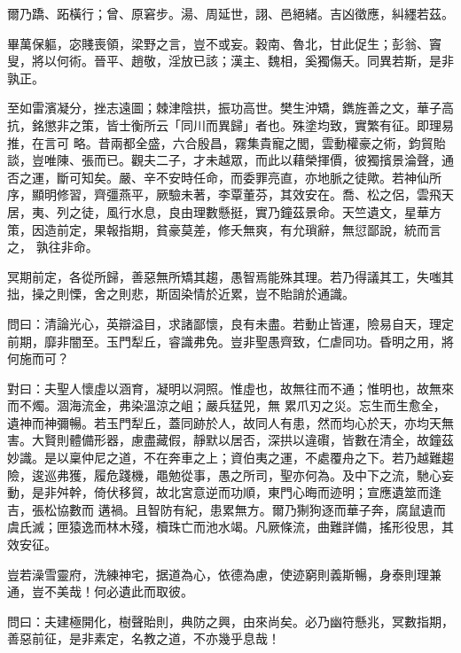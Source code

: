 \begin{pinyinscope}
 爾乃蹻、跖橫行；曾、原窘步。湯、周延世，詡、邑絕緒。吉凶徵應，糾纆若茲。



 畢萬保軀，宓賤喪領，梁野之言，豈不或妄。穀南、魯北，甘此促生；彭翁、竇叟，將以何術。晉平、趙敬，淫放已該；漢主、魏相，奚獨傷夭。同異若斯，是非孰正。



 至如雷濱凝分，挫志遠圖；棘津陰拱，振功高世。樊生沖矯，鐫旌善之文，華子高抗，銘懲非之策，皆士衡所云「同川而異歸」者也。殊塗均致，實繁有征。即理易推，在言可
 略。昔兩都全盛，六合殷昌，霧集貴寵之閭，雲動權豪之術，鈞貿貽談，豈唯陳、張而已。觀夫二子，才未越眾，而此以藉榮揮價，彼獨擯景淪聲，通否之運，斷可知矣。嚴、辛不安時任命，而委罪亮直，亦地脈之徒歟。若神仙所序，顯明修習，齊彊燕平，厥驗未著，李覃董芬，其效安在。喬、松之侶，雲飛天居，夷、列之徒，風行水息，良由理數懸挺，實乃鐘茲景命。天竺遺文，星華方策，因造前定，果報指期，貧豪莫差，修夭無爽，有允瑣辭，無愆鄙說，統而言之，
 孰往非命。



 冥期前定，各從所歸，善惡無所矯其趨，愚智焉能殊其理。若乃得議其工，失嗤其拙，操之則慄，舍之則悲，斯固染情於近累，豈不貽誚於通識。



 問曰：清論光心，英辯溢目，求諸鄙懷，良有未盡。若動止皆運，險易自天，理定前期，靡非闇至。玉門犁丘，睿識弗免。豈非聖愚齊致，仁虐同功。昏明之用，將何施而可？



 對曰：夫聖人懷虛以涵育，凝明以洞照。惟虛也，故無往而不通；惟明也，故無來而不燭。涸海流金，弗染溫涼之岨；嚴兵猛兕，無
 累爪刃之災。忘生而生愈全，遺神而神彌暢。若玉門犁丘，蓋同跡於人，故同人有患，然而均心於天，亦均天無害。大賢則體備形器，慮盡藏假，靜默以居否，深拱以違礥，皆數在清全，故鐘茲妙識。是以稟仲尼之道，不在奔車之上；資伯夷之運，不處覆舟之下。若乃越難趨險，逡巡弗獲，履危踐機，黽勉從事，愚之所司，聖亦何為。及中下之流，馳心妄動，是非舛幹，倚伏移貿，故北宮意逆而功順，東門心晦而迹明；宣應遺筮而逢吉，張松協數而
 遘禍。且智防有紀，患累無方。爾乃猘狗逐而華子奔，腐鼠遺而虞氏滅；匣猿逸而林木殘，櫝珠亡而池水竭。凡厥條流，曲難詳備，搖形役思，其效安征。



 豈若澡雪靈府，洗練神宅，据道為心，依德為慮，使迹窮則義斯暢，身泰則理兼通，豈不美哉！何必遺此而取彼。



 問曰：夫建極開化，樹聲貽則，典防之興，由來尚矣。必乃幽符懸兆，冥數指期，善惡前征，是非素定，名教之道，不亦幾乎息哉！




\end{pinyinscope}
